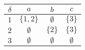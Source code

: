 
\begin{tabular}{c|ccc}
$\delta$ & $a$         & $b$         & $c$ \\\hline
$1$      & $\{1, 2\}$  & $\emptyset$ & $\{3\}$ \\[4pt]
$2$      & $\emptyset$ & $\{2\}$     & $\{3\}$ \\[4pt]
$3$      & $\emptyset$ & $\emptyset$ & $\emptyset$
\end{tabular}
